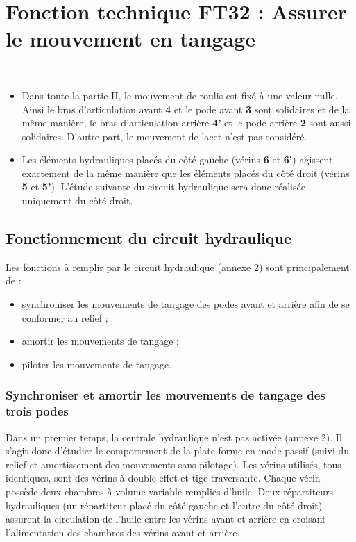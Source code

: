 \section{Fonction technique FT32 : Assurer le mouvement en tangage \label{sec:2}}

\begin{hypo}~\\
\begin{itemize}
\item Dans toute la partie II, le mouvement de roulis est fixé à une valeur nulle. Ainsi le bras d’articulation avant \textbf{4} et le pode avant \textbf{3} sont solidaires et de la même manière, le bras d’articulation arrière \textbf{4’} et le pode arrière \textbf{2} sont aussi solidaires. D’autre part, le mouvement de lacet n’est pas considéré.
\item Les éléments hydrauliques placés du côté gauche (vérins \textbf{6} et \textbf{6’}) agissent exactement de la même manière que les éléments placés du côté droit (vérins \textbf{5} et \textbf{5’}). L’étude suivante du circuit hydraulique sera donc réalisée uniquement du côté droit.
\end{itemize}
\end{hypo}

\subsection{Fonctionnement du circuit hydraulique}

Les fonctions à remplir par le circuit hydraulique (annexe 2) sont principalement de :
\begin{itemize}
\item synchroniser les mouvements de tangage des podes avant et arrière afin de se conformer au relief ;
\item amortir les mouvements de tangage ;
\item piloter les mouvements de tangage.
\end{itemize}

\subsubsection{Synchroniser et amortir les mouvements de tangage des trois podes}

Dans un premier temps, la centrale hydraulique n’est pas activée (annexe 2). Il s’agit donc d’étudier le comportement
de la plate-forme en mode passif (suivi du relief et amortissement des mouvements sans pilotage).
Les vérins utilisés, tous identiques, sont des vérins à double effet et tige traversante. Chaque vérin possède deux
chambres à volume variable remplies d’huile. Deux répartiteurs hydrauliques (un répartiteur placé du côté gauche et
l’autre du côté droit) assurent la circulation de l’huile entre les vérins avant et arrière en croisant l’alimentation des
chambres des vérins avant et arrière.

